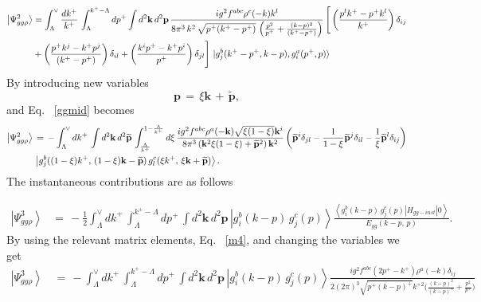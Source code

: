 \documentclass[aps,prd,amsmath,amssymb,nofootinbib]{revtex4-2}
\numberwithin{equation}{section}
\begin{document}
\begin{align}
\left|\Psi_{gg\rho}^{2}\right\rangle 
&=\int_{\Lambda}^{\vee}\frac{dk^{+}}{k^{+}}\,\int_{\Lambda}^{k^{+}-\Lambda}dp^{+}\int d^{2}\mathbf{k}\,d^{2}\mathbf{p}\, \frac{ig^{2}f^{abc}\rho^{c}(-k)k^{l}}{8\pi^{3}\,k^{2}\,\sqrt{p^{+}(k^{+}-p^{+})}\,\left(\frac{p^{2}}{p^{+}}+\frac{(k-p)^{2}}{(k^{+}-p^{+})}\right)}\,\Bigg[\left(\frac{p^{l}k^{+}-p^{+}k^{l}}{k^{+}}\right)\delta_{ij}\notag \\ & +\left(\frac{p^{+}k^{j}-k^{+}p^{j}}{(k^{+}-p^{+})}\right)\delta_{il} +\left(\frac{k^{i}p^{+}-k^{+}p^{i}}{p^{+}}\right)\delta_{jl}\Bigg]\, \ket{g^{b}_{j}(k^{+}-p^{+}, k-p),g^{a}_{i}(p^{+},p)}
\end{align}
By introducing new variables 
$$\mathbf{p}\,=\,\xi \mathbf{k}\,+\,\widetilde{\mathbf{p}},$$
and Eq.~ \eqref{ggmid} becomes
\begin{align}\label{contgg}
\left|\Psi_{gg\rho}^{2}\right\rangle\, & =\,-\int_{\Lambda}^{\vee}dk^{+}\,\int d^{2}\mathbf{k}\, d^{2}\widetilde{\mathbf{p}}\,\int_{\frac{\Lambda}{k^{+}}}^{1-\frac{\Lambda}{k^{+}}}d\xi\,\frac{ig^{2}f^{abc}\rho^{a}(-\mathbf{k})\sqrt{\xi(1-\xi)}\mathbf{k}^{i}}{8\pi^{3}\left(\mathbf{k}^{2}\xi(1-\xi)+\widetilde{\mathbf{p}}^{2}\right)\mathbf{k}^{2}}\left(\widetilde{\mathbf{p}}^{i}\delta_{jl}-\frac{1}{1-\xi}\widetilde{\mathbf{p}}^{j}\delta_{il}-\frac{1}{\xi}\widetilde{\mathbf{p}}^{l}\delta_{ij}\right)\notag \\ & \left|g_{j}^{b}((1-\xi)k^{+},\,(1-\xi)\mathbf{k}-\widetilde{\mathbf{p}})\,g_{l}^{c}(\xi k^{+},\,\xi\mathbf{k}+\widetilde{\mathbf{p}})\right\rangle.
\end{align}
The instantaneous contributions are as follows
\begin{figure}[h]
\end{figure}
\begin{align}\label{ggthree}
\left|\Psi_{gg\rho}^{3}\right\rangle &= \,-\frac{1}{2}\int_{\Lambda}^{\vee}dk^{+}\,\int_{\Lambda}^{k^{+}-\Lambda}dp^{+}\,\int d^{2}\mathbf{k}\, d^{2}\mathbf{p}\,\left|g_{i}^{b}(k-p)\, g_{j}^{c}(p)\right\rangle \frac{\left\langle g_{i}^{b}(k-p)\, g_{j}^{c}(p)\left|H_{gg-inst}\right|0\right\rangle }{E_{gg}(k-p,\, p)}.
\end{align}
By using the relevant matrix elements, Eq.~ \eqref{m4}, and changing the variables we get
\begin{align}\label{instgg3}
\left|\Psi_{gg\rho}^{3}\right\rangle \,& =\, -\int_{\Lambda}^{\vee}dk^{+}\,\int_{\Lambda}^{k^{+}-\Lambda}dp^{+}\,\int d^{2}\mathbf{k}\, d^{2}\mathbf{p}\,\left|g_{i}^{b}(k-p)\, g_{j}^{c}(p)\right\rangle  \frac{ig^{2}f^{abc}(2p^{+}-k^{+})\rho^{a}(-k)\delta_{ij}}{2(2\pi)^{3}\sqrt{p^{+}(k-p)^{+}}k^{+ 2}\bigg(\frac{(k-p)^{2}}{(k-p)^{+}}+\frac{p^{2}}{p^{+}}\bigg)}
\end{align}
\end{document}
